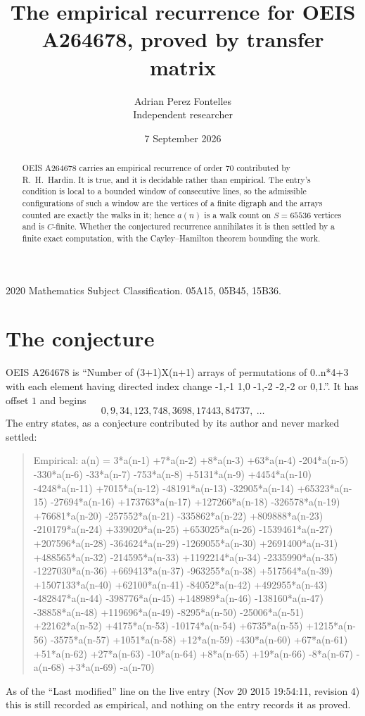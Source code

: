 \documentclass[11pt,a4paper]{article}
\title{The empirical recurrence for OEIS A264678, proved by transfer matrix}
\author{Adrian Perez Fontelles\\ \small Independent researcher}
\date{7 September 2026}
\theoremstyle{plain}
\theoremstyle{definition}
\begin{document}
\maketitle

\begin{abstract}
OEIS A264678 carries an empirical recurrence of order $70$ contributed by R.~H.~Hardin. It is
true, and it is decidable rather than empirical. The entry's condition is local to a bounded window of consecutive lines, so
the admissible configurations of such a window are the vertices of a finite digraph and the
arrays counted are exactly the walks in it; hence $a(n)$ is a walk count on $S=65536$ vertices
and is $C$-finite. Whether the conjectured recurrence annihilates it is then settled by a
finite exact computation, with the Cayley--Hamilton theorem bounding the work.
\end{abstract}

\noindent\small 2020 Mathematics Subject Classification. 05A15, 05B45, 15B36.\normalsize

\section{The conjecture}

OEIS A264678 is ``Number of (3+1)X(n+1) arrays of permutations of 0..n*4+3 with each element having directed index change -1,-1 1,0 -1,-2 -2,-2 or 0,1.''. It has offset $1$ and begins
\[
0, 9, 34, 123, 748, 3698, 17443, 84737,\ \dots
\]
The entry states, as a conjecture contributed by its author and never marked settled:
\begin{quote}
Empirical: a(n) = 3*a(n-1) +7*a(n-2) +8*a(n-3) +63*a(n-4) -204*a(n-5) -330*a(n-6) -33*a(n-7) -753*a(n-8) +5131*a(n-9) +4454*a(n-10) -4248*a(n-11) +7015*a(n-12) -48191*a(n-13) -32905*a(n-14) +65323*a(n-15) -27694*a(n-16) +173763*a(n-17) +127266*a(n-18) -326578*a(n-19) +76681*a(n-20) -257552*a(n-21) -335862*a(n-22) +809888*a(n-23) -210179*a(n-24) +339020*a(n-25) +653025*a(n-26) -1539461*a(n-27) +207596*a(n-28) -364624*a(n-29) -1269055*a(n-30) +2691400*a(n-31) +488565*a(n-32) -214595*a(n-33) +1192214*a(n-34) -2335990*a(n-35) -1227030*a(n-36) +669413*a(n-37) -963255*a(n-38) +517564*a(n-39) +1507133*a(n-40) +62100*a(n-41) -84052*a(n-42) +492955*a(n-43) -482847*a(n-44) -398776*a(n-45) +148989*a(n-46) -138160*a(n-47) -38858*a(n-48) +119696*a(n-49) -8295*a(n-50) -25006*a(n-51) +22162*a(n-52) +4175*a(n-53) -10174*a(n-54) +6735*a(n-55) +1215*a(n-56) -3575*a(n-57) +1051*a(n-58) +12*a(n-59) -430*a(n-60) +67*a(n-61) +51*a(n-62) +27*a(n-63) -10*a(n-64) +8*a(n-65) +19*a(n-66) -8*a(n-67) -a(n-68) +3*a(n-69) -a(n-70)
\end{quote}
As of the ``Last modified'' line on the live entry (Nov 20 2015 19:54:11, revision 4) this is still
recorded as empirical, and nothing on the entry records it as proved.
\end{document}
